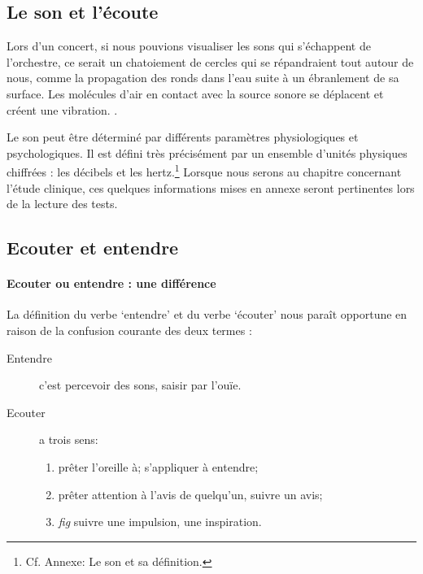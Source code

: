 
\subsection{Le son et l'écoute}

Lors d'un concert, si nous pouvions visualiser les sons qui
s'échappent de l'orchestre, ce serait un chatoiement de cercles qui se
répandraient tout autour de nous, comme
la propagation des
ronds dans l'eau suite à un ébranlement de sa surface.
Les molécules d'air en contact avec la source sonore se déplacent et
créent une vibration. \autocite[p. 183]{bencivelli:pourquoi,}.


Le son peut être déterminé par différents paramètres
physiologiques et psychologiques.
Il est défini très précisément par un ensemble d'unités physiques chiffrées
: les décibels  et les hertz.\footnote{Cf. Annexe: Le son et sa
  définition.}
Lorsque nous serons au chapitre concernant l'étude clinique,
ces quelques informations mises en annexe seront pertinentes lors de la lecture des tests.




\subsection{Ecouter et entendre}
\paragraph{Ecouter ou entendre : une différence}

La définition du verbe `entendre' et du verbe `écouter'
\autocite[pp. 361--385]{hachette:dictionnaire} nous paraît opportune
en raison de la confusion courante des deux termes :
\begin{description}
\item[Entendre] c'est  percevoir des sons, saisir par l'ouïe.
\item[Ecouter] a trois sens:
\begin{enumerate}
	\item prêter l'oreille à; s'appliquer à entendre;
	\item prêter attention à l'avis de quelqu'un, suivre un avis;
	\item \emph{fig} suivre une impulsion,	une inspiration.
\end{enumerate}
\end{description}


